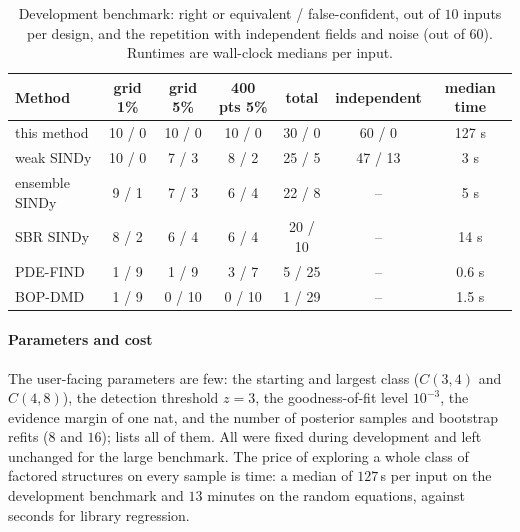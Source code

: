 \begin{table}[tbp]
\centering\small
\caption{Development benchmark: right or equivalent / false-confident, out of $10$ inputs per design, and the
repetition with independent fields and noise (out of $60$). Runtimes are wall-clock medians per input.}\label{tab:bench}
\begin{tabular}{@{}lcccccc@{}}
\toprule
Method & grid 1\% & grid 5\% & 400 pts 5\% & total & independent & median time\\
\midrule
this method        & 10 / 0 & 10 / 0 & 10 / 0 & 30 / 0 & 60 / 0 & 127 s\\
weak SINDy         & 10 / 0 & \phantom{1}7 / 3 & \phantom{1}8 / 2 & 25 / 5 & 47 / 13 & 3 s\\
ensemble SINDy     & \phantom{1}9 / 1 & \phantom{1}7 / 3 & \phantom{1}6 / 4 & 22 / 8 & -- & 5 s\\
SBR SINDy          & \phantom{1}8 / 2 & \phantom{1}6 / 4 & \phantom{1}6 / 4 & 20 / 10 & -- & 14 s\\
PDE-FIND           & \phantom{1}1 / 9 & \phantom{1}1 / 9 & \phantom{1}3 / 7 & \phantom{1}5 / 25 & -- & 0.6 s\\
BOP-DMD            & \phantom{1}1 / 9 & \phantom{1}0 / 10 & \phantom{1}0 / 10 & \phantom{1}1 / 29 & -- & 1.5 s\\
\bottomrule
\end{tabular}
\end{table}

\paragraph{Parameters and cost} The user-facing parameters are few: the starting and largest class ($C(3,4)$ and
$C(4,8)$), the detection threshold $z=3$, the goodness-of-fit level $10^{-3}$, the evidence margin of one nat, and the
number of posterior samples and bootstrap refits ($8$ and $16$); \SMalgo{} lists all of them. All were fixed during
development and left unchanged for the large benchmark. The price of exploring a whole class of factored structures on
every sample is time: a median of $127$\,s per input on the development benchmark and $13$ minutes on the random
equations, against seconds for library regression.

